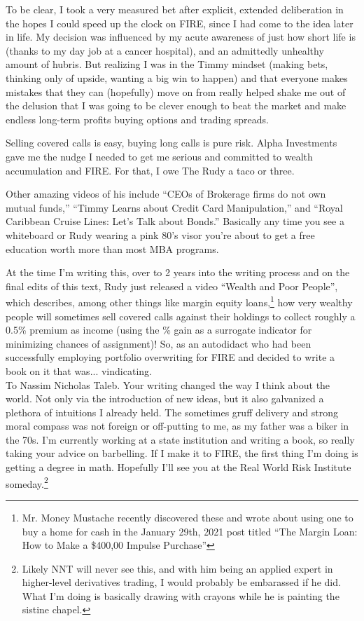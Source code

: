 To be clear, I took a very measured bet after explicit, extended deliberation in the hopes I could speed up the clock on FIRE, since I had come to the idea later in life. My decision was influenced by my acute awareness of just how short life is (thanks to my day job at a cancer hospital), and an admittedly unhealthy amount of hubris. But realizing I was in the Timmy mindset (making bets, thinking only of upside, wanting a big win to happen) and that everyone makes mistakes that they can (hopefully) move on from really helped shake me out of the delusion that I was going to be clever enough to beat the market and make endless long-term profits buying options and trading spreads. 

Selling covered calls is easy, buying long calls is pure risk. Alpha Investments gave me the nudge I needed to get me serious and committed to wealth accumulation and FIRE. For that, I owe The Rudy a taco or three.

Other amazing videos of his include “CEOs of Brokerage firms do not own mutual funds,” “Timmy Learns about Credit Card Manipulation,” and “Royal Caribbean Cruise Lines: Let’s Talk about Bonds.” Basically any time you see a whiteboard or Rudy wearing a pink 80’s visor you’re about to get a free education worth more than most MBA programs. 

At the time I’m writing this, over to 2 years into the writing process and on the final edits of this text, Rudy just released a video “Wealth and Poor People”, which describes, among other things like margin equity loans,\footnote{Mr. Money Mustache recently discovered these and wrote about using one to buy a home for cash in the January 29th, 2021 post titled “The Margin Loan: How to Make a \$400,00 Impulse Purchase”} how very wealthy people will sometimes sell covered calls against their holdings to collect roughly a 0.5\% premium as income (using the \% gain as a surrogate indicator for minimizing chances of assignment)! So, as an autodidact who had been successfully employing portfolio overwriting for FIRE and decided to write a book on it that was... vindicating.\\

To Nassim Nicholas Taleb. Your writing changed the way I think about the world. Not only via the introduction of new ideas, but it also galvanized a plethora of intuitions I already held. The sometimes gruff delivery and strong moral compass was not foreign or off-putting to me, as my father was a biker in the 70s. I'm currently working at a state institution and writing a book, so really taking your advice on barbelling. If I make it to FIRE, the first thing I'm doing is getting a degree in math. Hopefully I'll see you at the Real World Risk Institute someday.\footnote{Likely NNT will never see this, and with him being an applied expert in higher-level derivatives trading, I would probably be embarassed if he did. What I'm doing is basically drawing with crayons while he is painting the sistine chapel.}\\

